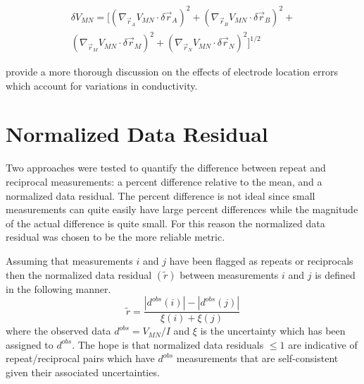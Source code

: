 \documentclass[final,authoryear,5p,times,twocolumn]{elsarticle}
\begin{document}
\begin{multline}
 \delta V_{MN} = \bigg[ (\nabla_{\vec{r}_{A}} V_{MN} \cdot \delta \vec{r}_{A} )^2+ (\nabla_{\vec{r}_{B}} V_{MN} \cdot \delta \vec{r}_{B})^2 + \\ 
 (\nabla_{\vec{r}_{M}} V_{MN} \cdot \delta \vec{r}_{M})^2 + (\nabla_{\vec{r}_{N}} V_{MN} \cdot \delta \vec{r}_{N})^2 \bigg]^{1/2}
\end{multline}

\cite{Oldenborger2005} provide a more thorough discussion on the effects of electrode location errors which account for variations in conductivity.

\section{Normalized Data Residual}
\label{Appen:NDR}
Two approaches were tested to quantify the difference between repeat and reciprocal measurements: a percent difference relative to the mean, and a normalized data residual. The percent difference is not ideal since small measurements can quite easily have large percent differences while the magnitude of the actual difference is quite small. For this reason the normalized data residual was chosen to be the more reliable metric. 

Assuming that measurements $i$ and $j$ have been flagged as repeats or reciprocals then the normalized data residual $\left(\tilde{r}\right)$ between measurements $i$ and $j$ is defined in the following manner. 
\begin{equation}
\label{eq:NormalizedDataResid}
\tilde{r}  = \frac{\left| d^{obs}(i) \right| - \left| d^{obs}(j) \right|}{\xi(i) + \xi(j)}
\end{equation} 
where the observed data $d^{obs} = V_{MN}/I$ and $\xi$ is the uncertainty which has been assigned to $d^{obs}$. The hope is that normalized data residuals $\leq 1$ are indicative of repeat/reciprocal pairs which have $d^{obs}$ measurements that are self-consistent given their associated uncertainties.




\end{document}
